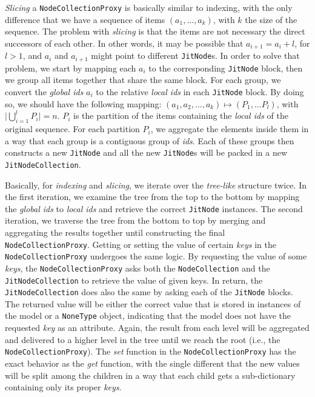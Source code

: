 \emph{Slicing} a \texttt{NodeCollectionProxy} is basically similar to indexing, with the only difference that we have a sequence of items $(a_1, \dots, a_k)$, with $k$ the size of the sequence. The problem with \emph{slicing} is that the items are not necessary the direct successors of each other. In other words, it may be possible that $a_{i+1} =a_i + l$, for $l > 1$, and $a_i$ and $a_{i+1}$ might point to different \texttt{JitNode}s. In order to solve that problem, we start by mapping each $a_i$ to the corresponding \texttt{JitNode} block, then we group all items together that share the same block. For each group, we convert the \emph{global ids} $a_i$ to the relative \emph{local ids} in each \texttt{JitNode} block. By doing so, we should have the following mapping: $(a_1, a_2, \dots, a_k) \mapsto (P_1, \dots P_l)$, with $\lvert\bigcup_{i=1}^{l} P_{i}\rvert =n$. $P_i$ is the partition of the
items containing the \emph{local ids} of the original sequence. For each partition $P_i$, we aggregate the elements inside them in a way that each group is a contiguous group of \emph{ids}. Each of these groups then constructs a new \texttt{JitNode} and all the new \texttt{JitNode}s will be packed in a new \texttt{JitNodeCollection}.


Basically, for \emph{indexing} and \emph{slicing}, we iterate over the \emph{tree-like} structure twice. In the first iteration, we examine the tree from the top to the bottom by mapping the \emph{global ids} to \emph{local ids} and retrieve the correct \texttt{JitNode} instances. The second iteration, we traverse the tree from the bottom to top by merging and aggregating the results together until constructing the final \texttt{NodeCollectionProxy}. Getting or setting the value of certain \emph{keys} in the \texttt{NodeCollectionProxy} undergoes the same logic. By requesting the value of some \emph{keys}, the \texttt{NodeCollectionProxy} asks both the \texttt{NodeCollection} and the \texttt{JitNodeCollection} to retrieve the value of given keys. In return, the \texttt{JitNodeCollection} does also the same by asking each of the \texttt{JitNode} blocks. The returned value will be either the correct value that is stored in instances of the model or a \texttt{NoneType} object, indicating that the model does not have the requested \emph{key} as an attribute. Again, the result from each level will be aggregated and delivered to a higher level in the tree until we reach the root (i.e., the \texttt{NodeCollectionProxy}). The \emph{set} function in the \texttt{NodeCollectionProxy} has the exact behavior as the \emph{get} function, with the single different that the new values will be split among the children in a way that  each child gets a sub-dictionary containing only its proper \emph{keys}.


